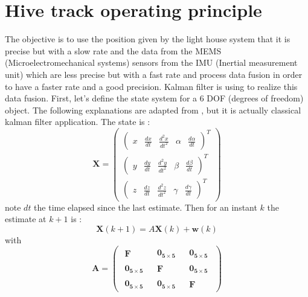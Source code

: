 \documentclass{vldb}
\begin{document}
\section{Hive track operating principle}
\label{Hive}

The objective is to use the position given by the light house system that it is precise but with a slow rate and the data from the MEMS (Microelectromechanical systems) sensors from the IMU (Inertial measurement unit) which are less precise but with a fast rate and process data fusion in order to have a faster rate and a good precision. Kalman filter is using to realize this data fusion. First, let's define the state system for a 6 DOF (degrees of freedom) object. The following explanations are adapted from \cite{caron2006gps}, but it is actually classical kalman filter application. The state is :
\begin{equation}
\mathbf{X} = 
\begin{pmatrix}
\begin{pmatrix}
x & \frac{dx}{dt} & \frac{d^2x}{dt^2} & \alpha & \frac{d\alpha}{dt}
\end{pmatrix} ^T \\
\begin{pmatrix}
y & \frac{dy}{dt} & \frac{d^2y}{dt^2} & \beta & \frac{d\beta}{dt}
\end{pmatrix} ^T \\
\begin{pmatrix}
z & \frac{dz}{dt} &  \frac{d^2z}{dt^2} & \gamma & \frac{d\gamma}{dt}
\end{pmatrix} ^T
\end{pmatrix}
\end{equation}
note $dt$ the time elapsed since the last estimate. Then for an instant $k$ the estimate at $k+1$ is : 
\begin{equation}
\mathbf{X}(k+1) = A \mathbf{X}(k) +  \mathbf{w}(k)
\end{equation}
with $$\mathbf{A}=
\begin{pmatrix}
\begin{matrix}
\mathbf{F}
\end{matrix} &
\begin{matrix}
\mathbf{0_{5 \times 5}}
\end{matrix} &
\begin{matrix}
\mathbf{0_{5 \times 5}}
\end{matrix} \\
\begin{matrix}
\mathbf{0_{5 \times 5}}
\end{matrix} &
\begin{matrix}
\mathbf{F}
\end{matrix} &
\begin{matrix}
\mathbf{0_{5 \times 5}}
\end{matrix} \\
\begin{matrix}
\mathbf{0_{5 \times 5}}
\end{matrix} &
\begin{matrix}
\mathbf{0_{5 \times 5}}
\end{matrix} &
\begin{matrix}
\mathbf{F}
\end{matrix}
\end{pmatrix}$$
\end{document}
